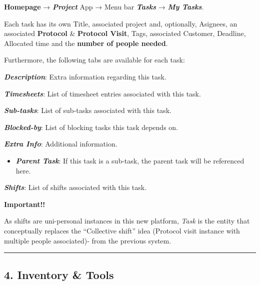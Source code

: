 \documentclass[
  paper=a4,
  ,captions=tableheading
]{scrartcl}
\providecommand{\tightlist}{%
  \setlength{\itemsep}{0pt}\setlength{\parskip}{0pt}}
\renewenvironment{quote}{\begin{mdframed}[backgroundcolor=calloutbg,linecolor=calloutborder,linewidth=3pt,topline=false,bottomline=false,rightline=false,innerleftmargin=10pt,innerrightmargin=10pt,innertopmargin=6pt,innerbottommargin=6pt]\small}{\end{mdframed}}
\renewenvironment{quote}{\begin{customblockquote}\list{}{\rightmargin=0em\leftmargin=0em}%
\item\relax\color{blockquote-text}\ignorespaces}{\unskip\unskip\endlist\end{customblockquote}}
\begin{document}
\begin{quote}
\textbf{Homepage} → \textbf{\emph{Project}} App → Menu bar
\textbf{\emph{Tasks}} → \textbf{\emph{My Tasks}}.
\end{quote}

Each task has its own Title, associated project and, optionally,
Asignees, an associated \textbf{Protocol} \& \textbf{Protocol Visit},
Tags, associated Customer, Deadline, Allocated time and the
\textbf{number of people needed}.

Furthermore, the following tabs are available for each task:

\begin{itemize}
\item
  \textbf{\emph{Description}}: Extra information regarding this task.
\item
  \textbf{\emph{Timesheets}}: List of timesheet entries associated with
  this task.
\item
  \textbf{\emph{Sub-tasks}}: List of sub-tasks associated with this
  task.
\item
  \textbf{\emph{Blocked-by}}: List of blocking tasks this task depends
  on.
\item
  \textbf{\emph{Extra Info}}: Additional information.

  \begin{itemize}
  \tightlist
  \item
    \textbf{\emph{Parent Task}}: If this task is a sub-task, the parent
    task will be referenced here.
  \end{itemize}
\item
  \textbf{\emph{Shifts}}: List of shifts associated with this task.

  \begin{quote}
  \textbf{Important!!}

  As shifts are uni-personal instances in this new platform, \emph{Task}
  is the entity that conceptually replaces the ``Collective shift'' idea
  (Protocol visit instance with multiple people associated)- from the
  previous system.
  \end{quote}
\end{itemize}

\begin{center}\rule{0.5\linewidth}{0.5pt}\end{center}

\hypertarget{inventory-tools}{%
\subsection{4. Inventory \& Tools}\label{inventory-tools}}
\end{document}
